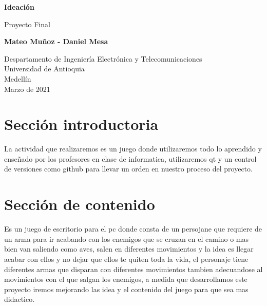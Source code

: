 \documentclass{article}
\begin{document}
\begin{titlepage}
    \begin{center}
        \vspace*{1cm}
            
        \Huge
        \textbf{Ideación}
            
        \vspace{0.5cm}
        \LARGE
        Proyecto Final
            
        \vspace{1.5cm}
            
        \textbf{Mateo Muñoz -
        Daniel Mesa }
            
        \vfill
            
        \vspace{0.8cm}
            
        \Large
        Despartamento de Ingeniería Electrónica y Telecomunicaciones\\
        Universidad de Antioquia\\
        Medellín\\
        Marzo de 2021
            
    \end{center}
\end{titlepage}

\tableofcontents

\section{Sección introductoria}\label{intro}
La actividad que realizaremos es un juego donde utilizaremos todo lo aprendido y enseñado por los profesores en clase de informatica, utilizaremos qt y un control de versiones como github para llevar un orden en nuestro proceso del proyecto.

\section{Sección de contenido} \label{contenido}
Es un juego de escritorio para el pc donde consta de un persojane que requiere de un arma para ir acabando con los enemigos que se cruzan en el camino o mas bien van saliendo como aves, salen en diferentes movimientos y la idea es llegar acabar con ellos y no dejar que ellos te quiten toda la vida, el personaje tiene diferentes armas que disparan con diferentes movimientos tambien adecuandose al movimientos con el que salgan los enemigos, a medida que desarrollamos este proyecto iremos mejorando las idea y el contenido del juego para que sea mas didactico.
\end{document}
